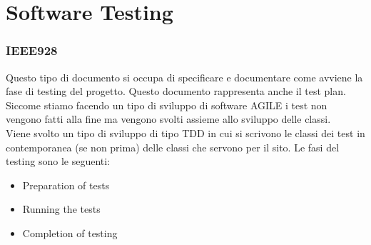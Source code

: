 \documentclass{article}
\begin{document}
\newpage
\section{Software Testing}
\subsubsection{IEEE928}
Questo tipo di documento si occupa di specificare e documentare come avviene la fase di testing
del progetto. Questo documento rappresenta anche il test plan. Siccome stiamo facendo un tipo di
sviluppo di software AGILE i test non vengono fatti alla fine ma vengono svolti assieme allo
sviluppo delle classi.
\\Viene svolto un tipo di sviluppo di tipo TDD in cui si scrivono le classi dei test in 
contemporanea (se non prima) delle classi che servono per il sito. Le fasi del testing sono le 
seguenti:
\begin{itemize}
    \item Preparation of tests 
    \item Running the  tests
    \item Completion of testing
\end{itemize} 
\end{document}
